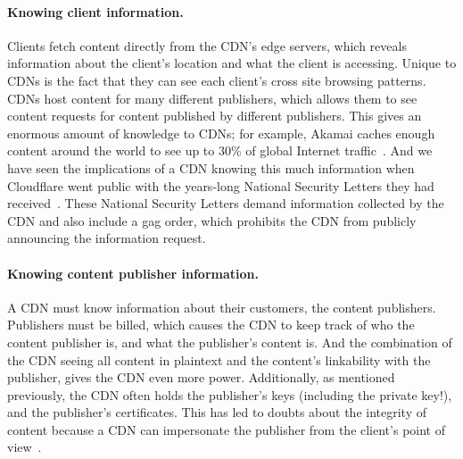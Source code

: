 \paragraph{Knowing client information.} Clients fetch content directly from the CDN's edge servers, which reveals 
information about the client's location and what the client is accessing.  Unique to CDNs is the fact that 
they can see each client's cross site browsing patterns.  CDNs host content for many different publishers, which allows 
them to see content requests for content published by different publishers.  This gives an enormous amount of 
knowledge to CDNs; for example, Akamai caches enough content around the world to see up to 30\% of global Internet 
traffic~\cite{akamai_global_traffic}.  And we have seen the implications of a CDN knowing this much information when Cloudflare 
went public with the years-long National Security Letters they had received~\cite{cloudflare_nsl}. These National Security Letters 
demand information collected by the CDN and also include a gag order, which prohibits the CDN from publicly announcing 
the information request.  

\paragraph{Knowing content publisher information.} A CDN must know information
about their customers, the content
publishers.  Publishers must be billed, which causes the CDN to keep track of who the content publisher is, and 
what the publisher's content is.  And the combination of the CDN seeing all content in plaintext and the content's 
linkability with the publisher, gives the CDN even more power.  Additionally, as mentioned previously, the CDN often 
holds the publisher's keys (including the private key!), and the publisher's certificates.  This has led to doubts 
about the integrity of content because a CDN can impersonate the publisher from the client's point of view~\cite{levy2015stickler}.


